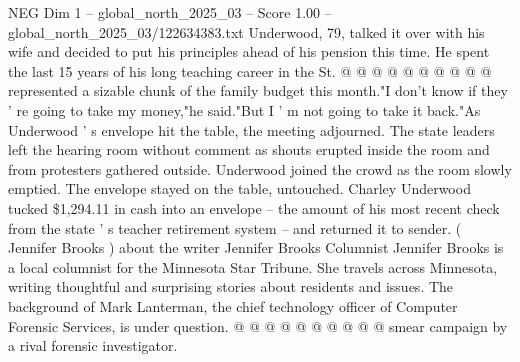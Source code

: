 \begin{textsample}{NEG Dim 1 – global\_north\_2025\_03 – Score 1.00 – global\_north\_2025\_03/122634383.txt}
Underwood, 79, talked it over with his wife and decided to put his principles ahead of his pension this time.
He spent the last 15 years of his long teaching career in the St. @ @ @ @ @ @ @ @ @ @ represented a sizable chunk of the family budget this month."I don't know if they ' re going to take my money,"he said."But I ' m not going to take it back."As Underwood ' s envelope hit the table, the meeting adjourned.
The state leaders left the hearing room without comment as shouts erupted inside the room and from protesters gathered outside.
Underwood joined the crowd as the room slowly emptied.
The envelope stayed on the table, untouched.
Charley Underwood tucked \$1,294.11 in cash into an envelope -- the amount of his most recent check from the state ' s teacher retirement system -- and returned it to sender. ( Jennifer Brooks ) about the writer Jennifer Brooks Columnist Jennifer Brooks is a local columnist for the Minnesota Star Tribune.
She travels across Minnesota, writing thoughtful and surprising stories about residents and issues.
The background of Mark Lanterman, the chief technology officer of Computer Forensic Services, is under question. @ @ @ @ @ @ @ @ @ @ smear campaign by a rival forensic investigator.

\end{textsample}
